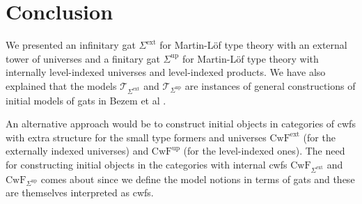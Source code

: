 \documentclass[11pt,a4paper]{article}
\theoremstyle{plain}
\theoremstyle{definition}
\newcommand{\T}{\mathsf{T}}
\def\leq{\mathrm{leq}}
\newcommand{\ty}{\mathrm{ty}}
\def\T{\mathcal{T}}
\def\CwF{\mathrm{CwF}}
\def\Sigmaext{{\Sigma^\mathrm{ext}}}
\def\Sigmaint{{\Sigma^\mathrm{up}}}
\begin{document}
\section{Conclusion}

We presented an infinitary gat $\Sigmaext$ for Martin-Löf type theory with an external tower of universes and a finitary gat $\Sigmaint$ for Martin-Löf type theory with internally level-indexed universes and level-indexed products. We have also explained that the models $\T_{\Sigmaext}$ and $\T_{\Sigmaint}$ are instances of general constructions of initial models of gats in 
Bezem et al \cite{bezem:hofmann}. 

An alternative approach would be to construct initial objects in categories of cwfs with extra structure for the small type formers and universes $\CwF^\mathrm{ext}$ (for the externally indexed universes) and $\CwF^\mathrm{up}$ (for the level-indexed ones). %
The need for constructing initial objects in the categories with internal cwfs $\CwF_{\Sigmaext}$ and  $\CwF_{\Sigmaint}$ comes about since we define the model notions in terms of gats and these are themselves interpreted as cwfs.

%
\end{document}
